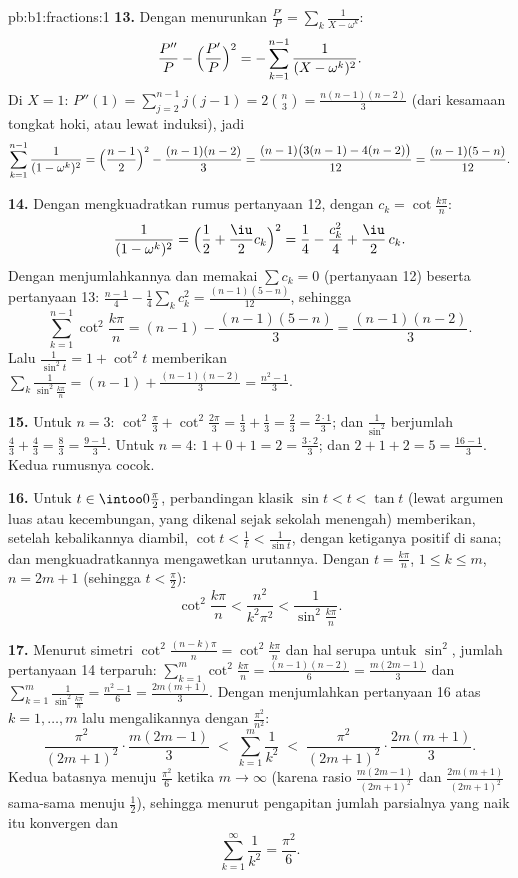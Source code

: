 \begin{solution}{pb:b1:fractions:1}
\textbf{13.} Dengan menurunkan $\frac{P'}P = \sum_k\frac1{X -
\omega^k}$:
\[
\frac{P''}P - \Bigl(\frac{P'}P\Bigr)^2
= -\sum_{k=1}^{n-1}\frac1{(X - \omega^k)^2} .
\]
Di $X = 1$: $P''(1) = \sum_{j=2}^{n-1}j(j-1) = 2\binom n3 =
\frac{n(n-1)(n-2)}3$ (dari kesamaan tongkat hoki, atau lewat induksi), jadi
\[
\sum_{k=1}^{n-1}\frac1{(1 - \omega^k)^2}
= \Bigl(\frac{n-1}2\Bigr)^2 - \frac{(n-1)(n-2)}3
= \frac{(n-1)\bigl(3(n-1) - 4(n-2)\bigr)}{12}
= \frac{(n-1)(5-n)}{12} .
\]

\textbf{14.} Dengan mengkuadratkan rumus pertanyaan 12, dengan $c_k =
\cot\frac{k\pi}n$:
\[
\frac1{(1-\omega^k)^2}
= \Bigl(\frac12 + \frac\iu2 c_k\Bigr)^2
= \frac14 - \frac{c_k^2}4 + \frac\iu2\,c_k .
\]
Dengan menjumlahkannya dan memakai $\sum c_k = 0$ (pertanyaan 12) beserta pertanyaan 13:
$\frac{n-1}4 - \frac14\sum_k c_k^2 = \frac{(n-1)(5-n)}{12}$, sehingga
\[
\sum_{k=1}^{n-1}\cot^2\frac{k\pi}n
= (n-1) - \frac{(n-1)(5-n)}3 = \frac{(n-1)(n-2)}3 .
\]
Lalu $\frac1{\sin^2t} = 1 + \cot^2t$ memberikan
$\sum_k\frac1{\sin^2\frac{k\pi}n} = (n-1) +
\frac{(n-1)(n-2)}3 = \frac{n^2-1}3$.

\textbf{15.} Untuk $n = 3$: $\cot^2\frac\pi3 + \cot^2\frac{2\pi}3 =
\frac13 + \frac13 = \frac23 = \frac{2\cdot1}3$; dan
$\frac1{\sin^2}$ berjumlah $\frac43 + \frac43 = \frac83 =
\frac{9-1}3$. Untuk $n = 4$: $1 + 0 + 1 = 2 = \frac{3\cdot2}3$; dan $2
+ 1 + 2 = 5 = \frac{16-1}3$. Kedua rumusnya cocok.

\textbf{16.} Untuk $t \in \intoo0{\frac\pi2}$, perbandingan klasik
$\sin t < t < \tan t$ (lewat argumen luas atau kecembungan, yang
dikenal sejak sekolah menengah) memberikan, setelah kebalikannya diambil, $\cot t <
\frac1t < \frac1{\sin t}$, dengan ketiganya positif di sana; dan mengkuadratkannya
mengawetkan urutannya. Dengan $t = \frac{k\pi}n$, $1 \leq k \leq m$,
$n = 2m+1$ (sehingga $t < \frac\pi2$):
\[
\cot^2\frac{k\pi}n < \frac{n^2}{k^2\pi^2} <
\frac1{\sin^2\frac{k\pi}n} .
\]

\textbf{17.} Menurut simetri $\cot^2\frac{(n-k)\pi}n =
\cot^2\frac{k\pi}n$ dan hal serupa untuk $\sin^2$, jumlah pertanyaan 14
terparuh: $\sum_{k=1}^{m}\cot^2\frac{k\pi}n = \frac{(n-1)(n-2)}6 =
\frac{m(2m-1)}3$ dan $\sum_{k=1}^m\frac1{\sin^2\frac{k\pi}n} =
\frac{n^2-1}6 = \frac{2m(m+1)}3$. Dengan menjumlahkan pertanyaan 16 atas $k =
1, \dots, m$ lalu mengalikannya dengan $\frac{\pi^2}{n^2}$:
\[
\frac{\pi^2}{(2m+1)^2}\cdot\frac{m(2m-1)}3
\;<\; \sum_{k=1}^{m}\frac1{k^2} \;<\;
\frac{\pi^2}{(2m+1)^2}\cdot\frac{2m(m+1)}3 .
\]
Kedua batasnya menuju $\frac{\pi^2}6$ ketika $m \to \infty$ (karena rasio
$\frac{m(2m-1)}{(2m+1)^2}$ dan $\frac{2m(m+1)}{(2m+1)^2}$ sama-sama
menuju $\frac12$), sehingga menurut pengapitan jumlah parsialnya yang naik itu
konvergen dan
\[
\sum_{k=1}^{\infty}\frac1{k^2} = \frac{\pi^2}6 .
\]


\end{solution}
